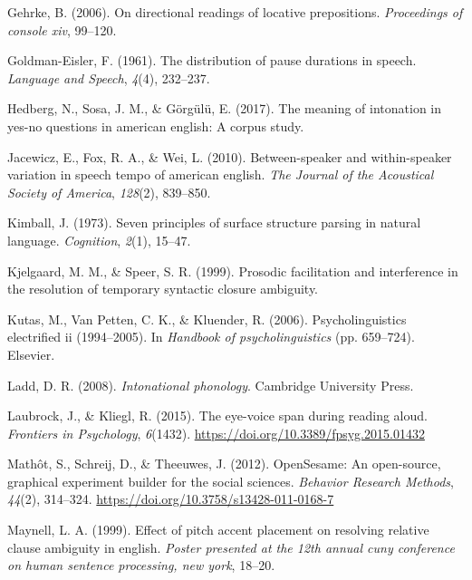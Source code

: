\documentclass[11pt,oneside]{book}
\begin{document}
\leavevmode\hypertarget{ref-geh}{}%
Gehrke, B. (2006). On directional readings of locative prepositions. \emph{Proceedings of console xiv}, 99--120.

\leavevmode\hypertarget{ref-goldman1961-pa}{}%
Goldman-Eisler, F. (1961). The distribution of pause durations in speech. \emph{Language and Speech}, \emph{4}(4), 232--237.

\leavevmode\hypertarget{ref-Hedberg2017-er}{}%
Hedberg, N., Sosa, J. M., \& Görgülü, E. (2017). The meaning of intonation in yes-no questions in american english: A corpus study.

\leavevmode\hypertarget{ref-jacewicz2010-sr}{}%
Jacewicz, E., Fox, R. A., \& Wei, L. (2010). Between-speaker and within-speaker variation in speech tempo of american english. \emph{The Journal of the Acoustical Society of America}, \emph{128}(2), 839--850.

\leavevmode\hypertarget{ref-kimball1973seven}{}%
Kimball, J. (1973). Seven principles of surface structure parsing in natural language. \emph{Cognition}, \emph{2}(1), 15--47.

\leavevmode\hypertarget{ref-Kjelgaard1999-xd}{}%
Kjelgaard, M. M., \& Speer, S. R. (1999). Prosodic facilitation and interference in the resolution of temporary syntactic closure ambiguity.

\leavevmode\hypertarget{ref-n400}{}%
Kutas, M., Van Petten, C. K., \& Kluender, R. (2006). Psycholinguistics electrified ii (1994--2005). In \emph{Handbook of psycholinguistics} (pp. 659--724). Elsevier.

\leavevmode\hypertarget{ref-ladd}{}%
Ladd, D. R. (2008). \emph{Intonational phonology}. Cambridge University Press.

\leavevmode\hypertarget{ref-evs}{}%
Laubrock, J., \& Kliegl, R. (2015). The eye-voice span during reading aloud. \emph{Frontiers in Psychology}, \emph{6}(1432). \url{https://doi.org/10.3389/fpsyg.2015.01432}

\leavevmode\hypertarget{ref-os2012}{}%
Mathôt, S., Schreij, D., \& Theeuwes, J. (2012). OpenSesame: An open-source, graphical experiment builder for the social sciences. \emph{Behavior Research Methods}, \emph{44}(2), 314--324. \url{https://doi.org/10.3758/s13428-011-0168-7}

\leavevmode\hypertarget{ref-maynell1999effect}{}%
Maynell, L. A. (1999). Effect of pitch accent placement on resolving relative clause ambiguity in english. \emph{Poster presented at the 12th annual cuny conference on human sentence processing, new york}, 18--20.
\end{document}
